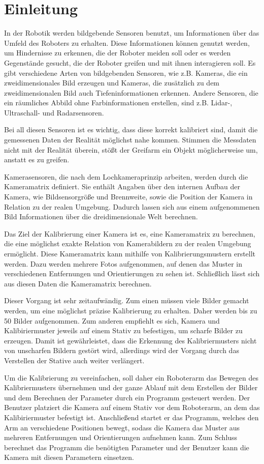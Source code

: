 \chapter{Einleitung}

In der Robotik werden bildgebende Sensoren benutzt, um Informationen über das Umfeld des Roboters zu erhalten. Diese Informationen können genutzt werden, um Hindernisse zu erkennen, die der Roboter meiden soll oder es werden Gegenstände gesucht, die der Roboter greifen und mit ihnen interagieren soll. Es gibt verschiedene Arten von bildgebenden Sensoren, wie z.B. Kameras, die ein zweidimensionales Bild erzeugen und Kameras, die zusätzlich zu dem zweidimensionalen Bild auch Tiefeninformationen erkennen. Andere Sensoren, die ein räumliches Abbild ohne Farbinformationen erstellen, sind z.B. Lidar-, Ultraschall- und Radarsensoren.

Bei all diesen Sensoren ist es wichtig, dass diese korrekt kalibriert sind, damit die gemessenen Daten der Realität möglichst nahe kommen. Stimmen die Messdaten nicht mit der Realität überein, stößt der Greifarm ein Objekt möglicherweise um, anstatt es zu greifen.

Kamerasensoren, die nach dem Lochkameraprinzip arbeiten, werden durch die Kameramatrix definiert. Sie enthält Angaben über den internen Aufbau der Kamera, wie Bildsensorgröße und Brennweite, sowie die Position der Kamera in Relation zu der realen Umgebung. Dadurch lassen sich aus einem aufgenommenen Bild Informationen über die dreidimensionale Welt berechnen. 

Das Ziel der Kalibrierung einer Kamera ist es, eine Kameramatrix zu berechnen, die eine möglichst exakte Relation von Kamerabildern zu der realen Umgebung ermöglicht. Diese Kameramatrix kann mithilfe von Kalibrierungsmustern erstellt werden. Dazu werden mehrere Fotos aufgenommen, auf denen das Muster in verschiedenen Entfernungen und Orientierungen zu sehen ist. Schließlich lässt sich aus diesen Daten die Kameramatrix berechnen.

Dieser Vorgang ist sehr zeitaufwändig. Zum einen müssen viele Bilder gemacht werden, um eine möglichst präzise Kalibrierung zu erhalten. Daher werden bis zu 50 Bilder aufgenommen. Zum anderen empfiehlt es sich, Kamera und Kalibiriermuster jeweils auf einem Stativ zu befestigen, um scharfe Bilder zu erzeugen. Damit ist gewährleistet, dass die Erkennung des Kalibriermusters nicht von unscharfen Bildern gestört wird, allerdings wird der Vorgang durch das Verstellen der Stative auch weiter verlängert.

Um die Kalibrierung zu vereinfachen, soll daher ein Roboterarm das Bewegen des Kalibriermusters übernehmen und der ganze Ablauf mit dem Erstellen der Bilder und dem Berechnen der Parameter durch ein Programm gesteuert werden. Der Benutzer platziert die Kamera auf einem Stativ vor dem Roboterarm, an dem das Kalibiriermuster befestigt ist. Anschließend startet er das Programm, welches den Arm an verschiedene Positionen bewegt, sodass die Kamera das Muster aus mehreren Entfernungen und Orientierungen aufnehmen kann. Zum Schluss berechnet das Programm die benötigten Parameter und der Benutzer kann die Kamera mit diesen Parametern einsetzen.


